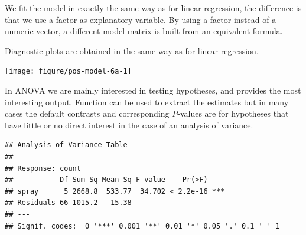 \documentclass[krantz2]{krantz}\usepackage{knitr}%
\begin{document}
We fit the model in exactly the same way as for linear regression, the difference is that we use a factor as explanatory variable. By using a factor instead of a numeric vector, a different model matrix is built from an equivalent formula.

\begin{knitrout}\footnotesize
{}\color{fgcolor}\begin{kframe}
\begin{alltt}
 \hlkwb{<-}  \hlopt{~}   
\end{alltt}
\end{kframe}
\end{knitrout}

Diagnostic plots are obtained in the same way as for linear regression.

\begin{knitrout}\footnotesize
{}\color{fgcolor}\begin{kframe}
\begin{alltt}
  \hlstd{=} \hlstd{)}
\end{alltt}
\end{kframe}

{\centering \texttt{[image: figure/pos-model-6a-1]} 

}



\end{knitrout}

In ANOVA we are mainly interested in testing hypotheses, and  provides the most interesting output. Function  can be used to extract the estimates but in many cases the default contrasts and corresponding $P$-values are for hypotheses that have little or no direct interest in the case of an analysis of variance.

\begin{knitrout}\footnotesize
{}\color{fgcolor}\begin{kframe}
\begin{alltt}
\end{alltt}
\begin{verbatim}
## Analysis of Variance Table
## 
## Response: count
##           Df Sum Sq Mean Sq F value    Pr(>F)    
## spray      5 2668.8  533.77  34.702 < 2.2e-16 ***
## Residuals 66 1015.2   15.38                      
## ---
## Signif. codes:  0 '***' 0.001 '**' 0.01 '*' 0.05 '.' 0.1 ' ' 1
\end{verbatim}
\end{kframe}
\end{knitrout}
\end{document}
